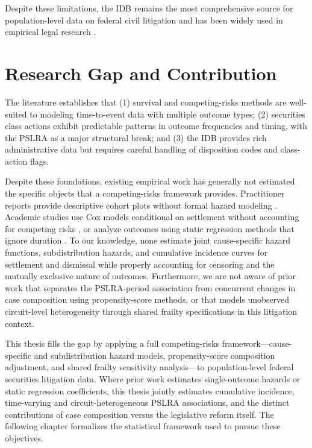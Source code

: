Despite these limitations, the IDB remains the most
comprehensive source for population-level data on federal civil
litigation and has been widely used in empirical legal research
\citep{clermont2002, scales2024}.

\section{Research Gap and Contribution}

The literature establishes that (1) survival and
competing-risks methods are well-suited to modeling
time-to-event data with multiple outcome types; (2) securities
class actions exhibit predictable patterns in outcome
frequencies and timing, with the PSLRA as a major structural
break; and (3) the IDB provides rich administrative data but
requires careful handling of disposition codes and class-action
flags.

Despite these foundations, existing empirical work has generally
not estimated the specific objects that a competing-risks
framework provides. Practitioner reports provide descriptive cohort plots
without formal hazard modeling \citep{cornerstone2024}.
Academic studies use Cox models conditional on settlement
without accounting for competing risks \citep{brochet2014},
or analyze outcomes using static regression methods that ignore
duration \citep{cox2008, johnson2001}. To our knowledge, none estimate joint
cause-specific hazard functions, subdistribution hazards, and
cumulative incidence curves for settlement and dismissal while
properly accounting for censoring and the mutually exclusive
nature of outcomes. Furthermore, we are not aware of prior
work that separates the PSLRA-period association from
concurrent changes in case composition using propensity-score
methods, or that models unobserved circuit-level heterogeneity
through shared frailty specifications in this litigation
context.

This thesis fills the gap by applying a full
competing-risks framework---cause-specific and
subdistribution hazard models, propensity-score composition
adjustment, and shared frailty sensitivity
analysis---to population-level federal securities litigation
data. Where prior work estimates single-outcome hazards or
static regression coefficients, this thesis jointly
estimates cumulative incidence, time-varying and
circuit-heterogeneous PSLRA associations, and the distinct
contributions of case composition versus the legislative
reform itself. The following chapter formalizes the
statistical framework used to pursue these objectives.
